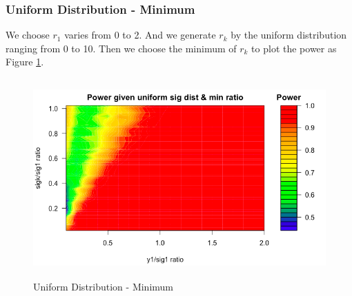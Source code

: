 \documentclass[10pt,english]{article}\usepackage{graphicx, color}
\numberwithin{equation}{section}
\numberwithin{figure}{section}
\begin{document}
\subsubsection{Uniform Distribution - Minimum}
We choose $r_1$ varies from 0 to 2. And we generate $r_k$ by the uniform distribution ranging from 0 to 10. Then we choose the minimum of $r_k$ to plot the power as Figure \ref{1}.
\begin{figure}[htbp]
\centering\includegraphics[width=4.5in,height=3in]{uni_min}
\caption{\label{1}Uniform Distribution - Minimum}
\end{figure}
\quad\\
\quad\\
\quad\\
\quad\\
\quad\\
\quad\\
\quad\\
\quad\\
\quad\\
\quad\\
\quad\\
\quad\\
\end{document}
